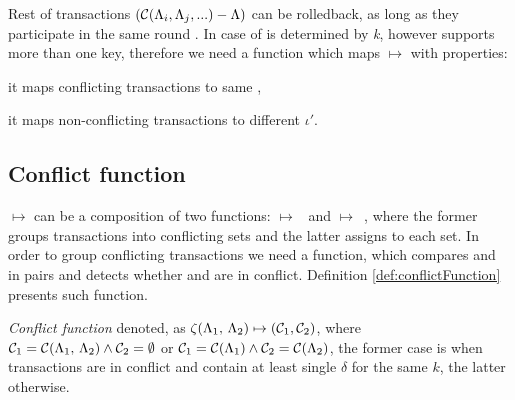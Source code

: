 

Rest of transactions $(\mathcal{C}\text{$(\Lambda_{i}, \Lambda_{j}, ...)$} - \text{$\Lambda$})$ can be rolledback, as long as they participate in the same \paxos round \paxosRoundId. In case of \lwt \paxosRoundId is determined by \emph{k}, however \mpt supports more than one key, therefore we need a function which maps \txState $\mapsto $ \paxosRoundId with properties: 
\begin{enumerate*}[label=\alph*)]
\item it maps conflicting transactions to same \paxosRoundId,
\item it maps non-conflicting transactions to different $\iota'$.
\end{enumerate*}

\subsection{Conflict function}
\txState $\mapsto $ \paxosRoundId can be a composition of two functions: \mbox{\txState $\mapsto $ \conflictingTxSet} and \mbox{\conflictingTxSet $\mapsto$ \paxosRoundId}, where the former groups transactions into conflicting sets and the latter assigns \paxosRoundId to each set.
In order to group conflicting transactions we need a function, which compares \txStateOne and \txStateTwo in pairs and detects whether
\txStateOne and \txStateTwo are in conflict. Definition \ref{def:conflictFunction} presents such function.

\begin{definition}
\label{def:conflictFunction}
\emph{Conflict function} denoted, as $\zeta (\text{$\Lambda_1$, $\Lambda_2$}) \mapsto ( \mathcal{C}_1, \mathcal{C}_2)$, where $\mathcal{C}_1 = \mathcal{C}(\text{$\Lambda_1$, $\Lambda_2$}) \wedge \mathcal{C}_2 = \emptyset $ or $\mathcal{C}_1 = \mathcal{C}(\text{$\Lambda_1$}) \wedge \mathcal{C}_2=\mathcal{C}(\text{$\Lambda_2$})$, the former case is when transactions are in conflict and contain at least single $\delta$ for the same $k$, the latter otherwise.
\end{definition}